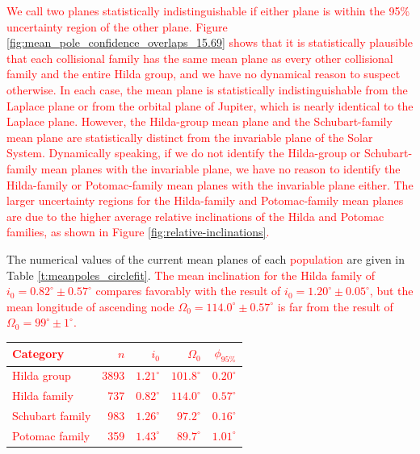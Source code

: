 \documentclass[a4paper,fleqn]{cas-sc}
\begin{document}
\begin{linenumbers}
\textcolor{red}{
We call two planes statistically indistinguishable if either plane is within the 95\% uncertainty region of the other plane.
Figure \ref{fig:mean_pole_confidence_overlaps_15.69} shows that it is statistically plausible that each collisional family has the same mean plane as every other collisional family and the entire Hilda group, and we have no dynamical reason to suspect otherwise.
In each case, the mean plane is statistically indistinguishable from the Laplace plane or from the orbital plane of Jupiter, which is nearly identical to the Laplace plane.
However, the Hilda-group mean plane and the Schubart-family mean plane are statistically distinct from the invariable plane of the Solar System.
Dynamically speaking, if we do not identify the Hilda-group or Schubart-family mean planes with the invariable plane, we have no reason to identify the Hilda-family or Potomac-family mean planes with the invariable plane either.
The larger uncertainty regions for the Hilda-family and Potomac-family mean planes are due to the higher average relative inclinations of the Hilda and Potomac families, as shown in Figure \ref{fig:relative-inclinations}.
}



The numerical values of the current mean planes of each \textcolor{red}{population} are given in Table \ref{t:meanpoles_circlefit}.
\textcolor{red}{The mean inclination for the Hilda family of $i_0=0.82^\circ\pm0.57^\circ$ compares favorably with the \citet{vinogradova2015} result of $i_0=1.20^\circ\pm0.05^\circ$, but the mean longitude of ascending node $\Omega_0=114.0^\circ\pm0.57^\circ$ is far from the \citet{vinogradova2015} result of $\Omega_0=99^\circ\pm1^\circ$.} 
\begin{table}
    \centering
        \begin{tabular}{lrrrr}
         \textcolor{red}{Category} & \textcolor{red}{$n$} & \textcolor{red}{$i_0$} & \textcolor{red}{$\Omega_0$} & \textcolor{red}{$\phi_{95\%}$} \\
         \hline
         \textcolor{red}{Hilda group} & \textcolor{red}{3893} & \textcolor{red}{$1.21^\circ$} & \textcolor{red}{$101.8^\circ$} & \textcolor{red}{$0.20^\circ$} \\
         \textcolor{red}{Hilda family} & \textcolor{red}{737} & \textcolor{red}{$0.82^\circ$} & \textcolor{red}{$114.0^\circ$} & \textcolor{red}{$0.57^\circ$} \\
      \textcolor{red}{Schubart family} & \textcolor{red}{983} & \textcolor{red}{$1.26^\circ$} & \textcolor{red}{$ 97.2^\circ$} & \textcolor{red}{$0.16^\circ$} \\
      \textcolor{red}{Potomac family}  & \textcolor{red}{359} & \textcolor{red}{$1.43^\circ$} & \textcolor{red}{$ 89.7^\circ$} & \textcolor{red}{$1.01^\circ$}
    \end{tabular}


\end{table}
\end{linenumbers}
\end{document}
